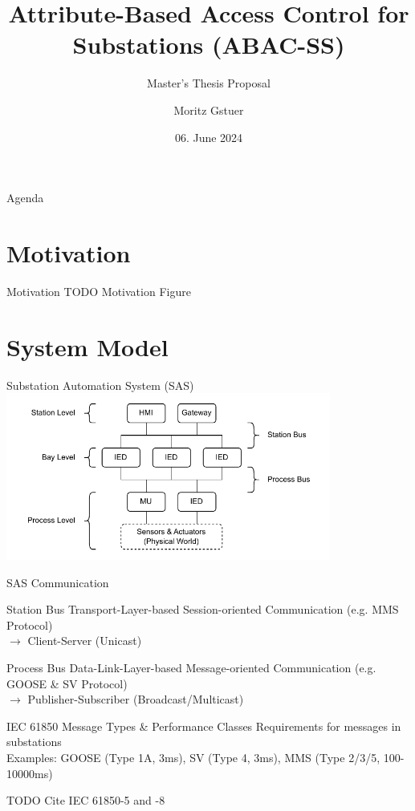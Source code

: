 \documentclass[en]{sdqbeamer}
\title[ABAC for Substations]{Attribute-Based Access Control for Substations (ABAC-SS)}
\subtitle{Master's Thesis Proposal}
\author[Moritz Gstuer]{Moritz Gstuer}
\date[06.\,06.\,2024]{06. June 2024}
\begin{document}
 
\KITtitleframe

\begin{frame}{Agenda}
\tableofcontents
\end{frame}

\section{Motivation}
\begin{frame}{Motivation}
    TODO Motivation Figure
\end{frame}

\section{System Model}
\begin{frame}{Substation Automation System (SAS)}
    \centering
	\includegraphics[width=0.8\textwidth]{./figures/substation_architecture.drawio.pdf}
\end{frame}

\begin{frame}{SAS Communication}
    \begin{blueblock}{Station Bus}
        Transport-Layer-based Session-oriented Communication (e.g. MMS Protocol)
        \\$\rightarrow$ Client-Server (Unicast)
    \end{blueblock}
    \begin{blueblock}{Process Bus}
        Data-Link-Layer-based Message-oriented Communication (e.g. GOOSE \& SV Protocol)
        \\$\rightarrow$ Publisher-Subscriber (Broadcast/Multicast)
    \end{blueblock}
    \begin{grayblock}{IEC 61850 Message Types \& Performance Classes}
        Requirements for messages in substations
        \\Examples: GOOSE (Type 1A, 3ms), SV (Type 4, 3ms), MMS (Type 2/3/5, 100-10000ms)
    \end{grayblock}
    TODO Cite IEC 61850-5 and -8
\end{frame}
\end{document}
